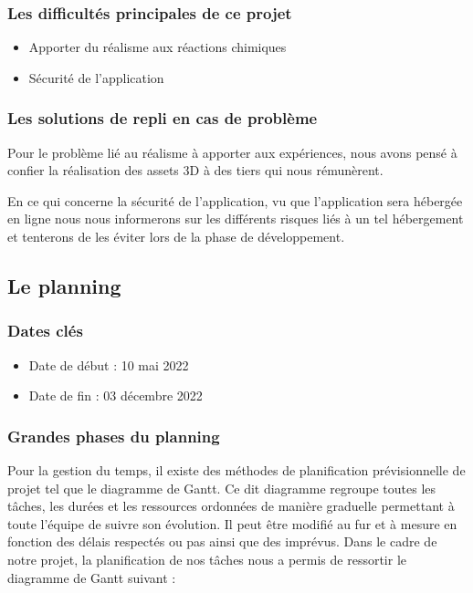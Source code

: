 \subsubsection{Les difficultés principales de ce projet}

\begin{itemize}
	\item Apporter du réalisme aux réactions chimiques
	\item Sécurité de l’application
\end{itemize}

\subsubsection{Les solutions de repli en cas de problème }

Pour le problème lié au réalisme à apporter aux expériences, nous avons pensé à confier la réalisation des assets 3D à des tiers qui nous rémunèrent.

En ce qui concerne la sécurité de l’application, vu que l’application sera hébergée en ligne nous nous informerons sur les différents risques liés à un tel hébergement et tenterons de les éviter lors de la phase de développement.

\subsection{Le planning}

\subsubsection{Dates clés}

\begin{itemize}
	\item Date de début : 10 mai 2022
	\item Date de fin :  03 décembre 2022
\end{itemize}

\subsubsection{Grandes phases du planning}

Pour la gestion du temps, il existe des méthodes de planification prévisionnelle de projet tel que le diagramme de Gantt. Ce dit diagramme regroupe toutes les tâches, les durées et les ressources ordonnées de manière graduelle permettant à toute l’équipe de suivre son évolution. Il peut être modifié au fur et à mesure en fonction des délais respectés ou pas ainsi que des imprévus. Dans le cadre de notre projet, la planification de nos tâches nous a permis de ressortir le diagramme de Gantt suivant :


